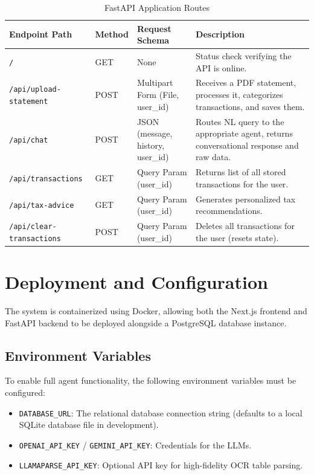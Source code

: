 \documentclass[11pt,a4paper]{article}
\begin{document}
\begin{table}[htbp]
\centering
\small
\begin{tabular}{lllp{6cm}}
\toprule
\textbf{Endpoint Path} & \textbf{Method} & \textbf{Request Schema} & \textbf{Description} \\
\midrule
\texttt{/} & GET & None & Status check verifying the API is online. \\
\texttt{/api/upload-statement} & POST & Multipart Form (File, user\_id) & Receives a PDF statement, processes it, categorizes transactions, and saves them. \\
\texttt{/api/chat} & POST & JSON (message, history, user\_id) & Routes NL query to the appropriate agent, returns conversational response and raw data. \\
\texttt{/api/transactions} & GET & Query Param (user\_id) & Returns list of all stored transactions for the user. \\
\texttt{/api/tax-advice} & GET & Query Param (user\_id) & Generates personalized tax recommendations. \\
\texttt{/api/clear-transactions} & POST & Query Param (user\_id) & Deletes all transactions for the user (resets state). \\
\bottomrule
\end{tabular}
\caption{FastAPI Application Routes}
\label{tab:endpoints}
\end{table}

\section{Deployment and Configuration}
The system is containerized using Docker, allowing both the Next.js frontend and FastAPI backend to be deployed alongside a PostgreSQL database instance.

\subsection{Environment Variables}
To enable full agent functionality, the following environment variables must be configured:
\begin{itemize}
    \item \texttt{DATABASE\_URL}: The relational database connection string (defaults to a local SQLite database file in development).
    \item \texttt{OPENAI\_API\_KEY} / \texttt{GEMINI\_API\_KEY}: Credentials for the LLMs.
    \item \texttt{LLAMAPARSE\_API\_KEY}: Optional API key for high-fidelity OCR table parsing.
\end{itemize}
\end{document}
